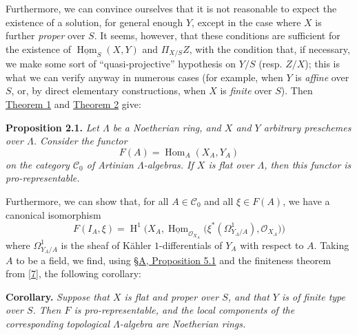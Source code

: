 \documentclass{article}
\newenvironment{itenv}[1]
  {\phantomsection\par\smallskip\noindent\textbf{#1.}\itshape}
  {\par\smallskip}
\newcommand{\oldpage}[1]{\marginpar{\footnotesize$\Big\vert$ \textit{p.~#1}}}
\theoremstyle{definition}
\theoremstyle{definition}
\theoremstyle{definition}
\theoremstyle{definition}
\theoremstyle{remark}
\begin{document}
Furthermore, we can convince ourselves that it is not reasonable to expect the existence of a solution, for general enough \(Y\), except in the case where \(X\) is further \emph{proper} over \(S\).
It seems, however, that these conditions are sufficient for the existence of \(\underline{\operatorname{Hom}}_S(X,Y)\) and \(\Pi_{X/S}Z\), with the condition that, if necessary, we make some sort of ``quasi-projective'' hypothesis on \(Y/S\) (resp. \(Z/X\));
this is what we can verify anyway in numerous cases (for example, when \(Y\) is \emph{affine} over \(S\), or, by direct elementary constructions, when \(X\) is \emph{finite} over \(S\)).
Then \protect\hyperlink{fga-3-ii-section-B-theorem-1}{Theorem 1} and \protect\hyperlink{fga-3-ii-section-B-theorem-2}{Theorem 2} give:

\leavevmode{}%
\begin{itenv}{Proposition 2.1}
\oldpage{195-14}Let \(\Lambda\) be a Noetherian ring, and \(X\) and \(Y\) arbitrary preschemes over \(\Lambda\).
Consider the functor
\[
  F(A) = \operatorname{Hom}_A(X_A,Y_A)
\]
on the category \({\mathcal{C}}_0\) of Artinian \(\Lambda\)-algebras.
If \(X\) is flat over \(\Lambda\), then this functor is pro-representable.

\end{itenv}

Furthermore, we can show that, for all \(A\in{\mathcal{C}}_0\) and all \(\xi\in F(A)\), we have a canonical isomorphism
\[
  F(I_A,\xi) = \operatorname{H}^1\Big(X_A,\underline{\operatorname{Hom}}_{{\mathscr{O}}_{X_A}}\big(\xi^*(\Omega_{Y_A/A}^1),{\mathscr{O}}_{X_A}\big)\Big)
\]
where \(\Omega_{Y_A/A}^1\) is the sheaf of Kähler \(1\)-differentials of \(Y_A\) with respect to \(A\).
Taking \(A\) to be a field, we find, using \protect\hyperlink{fga-3-ii-section-A.5-proposition-5.1}{§A, Proposition 5.1} and the finiteness theorem from {[}\protect\hyperlink{ref-Gro1958a}{7}{]}, the following corollary:

\begin{itenv}{Corollary}
Suppose that \(X\) is flat and proper over \(S\), and that \(Y\) is of finite type over \(S\).
Then \(F\) is pro-representable, and the local components of the corresponding topological \(\Lambda\)-algebra are \emph{Noetherian} rings.

\end{itenv}
\end{document}
